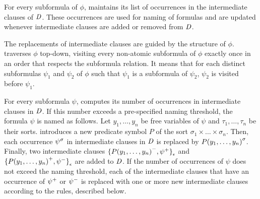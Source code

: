 For every subformula of $\phi$, \newcnf{} maintains its list of occurrences in the intermediate clauses of $\mathit{D}$. These occurrences are used for naming of formulas and are updated whenever intermediate clauses are added or removed from $\mathit{D}$. 

The replacements of intermediate clauses are guided by the structure of $\phi$. \newcnf{} traverses $\phi$ top-down, visiting every non-atomic subformula of $\phi$ exactly once in an order that respects the subformula relation. It means that for each distinct subformulas $\psi_1$ and $\psi_2$ of $\phi$ such that $\psi_1$ is a subformula of $\psi_2$, $\psi_2$ is visited before $\psi_1$.

For every subformula $\psi$, \newcnf{} computes its number of occurrences in intermediate clauses in $\mathit{D}$. If this number exceeds a pre-specified naming threshold, the formula $\psi$ is named as follows. Let $y_1,\ldots,y_n$ be free variables of $\psi$ and $\tau_1,\ldots,\tau_n$ be their sorts. \newcnf{} introduces a new predicate symbol $P$ of the sort $\sigma_1\times\ldots\times\sigma_n$. Then, each occurrence ${\psi}^{\sigma}$ in intermediate clauses in $\mathit{D}$ is replaced by ${P(y_1,\ldots,y_n)}^{\sigma}$. Finally, two intermediate clauses ${\{{P(y_1,\ldots,y_n)}^{-},{\psi}^{+}\}}_{\epsilon}$ and ${\{{P(y_1,\ldots,y_n)}^{+},{\psi}^{-}\}}_{\epsilon}$ are added to $\mathit{D}$. If the number of occurrences of $\psi$ does not exceed the naming threshold, each of the intermediate clauses that have an occurrence of ${\psi}^{+}$ or ${\psi}^{-}$ is replaced with one or more new intermediate clauses according to the rules, described below.

